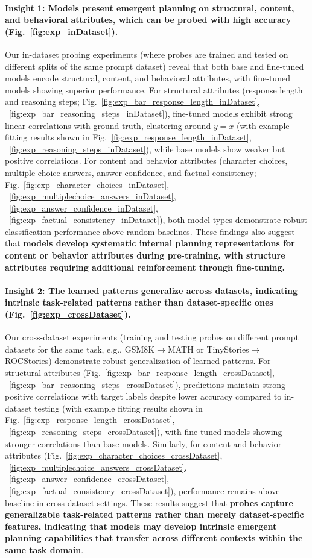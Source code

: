 \paragraph{Insight 1: Models present emergent planning on structural, content, and behavioral attributes, which can be probed with high accuracy (Fig.~\ref{fig:exp_inDataset}).}
Our in-dataset probing experiments (where probes are trained and tested on different splits of the same prompt dataset) reveal that both base and fine-tuned models encode structural, content, and behavioral attributes, with fine-tuned models showing superior performance. 
For structural attributes (response length and reasoning steps; Fig.~\ref{fig:exp_bar_response_length_inDataset}, ~\ref{fig:exp_bar_reasoning_steps_inDataset}), fine-tuned models exhibit strong linear correlations with ground truth, clustering around $y=x$ (with example fitting results shown in Fig.~\ref{fig:exp_response_length_inDataset}, ~\ref{fig:exp_reasoning_steps_inDataset}), while base models show weaker but positive correlations. 
For content and behavior attributes (character choices, multiple-choice answers, answer confidence, and factual consistency; Fig.~\ref{fig:exp_character_choices_inDataset}, ~\ref{fig:exp_multiplechoice_answers_inDataset}, ~\ref{fig:exp_answer_confidence_inDataset}, ~\ref{fig:exp_factual_consistency_inDataset}), both model types demonstrate robust classification performance above random baselines.
These findings also suggest that \textbf{models develop systematic internal planning representations for content or behavior attributes during pre-training, with structure attributes requiring additional reinforcement through fine-tuning.}

\paragraph{Insight 2: The learned patterns generalize across datasets, indicating intrinsic task-related patterns rather than dataset-specific ones (Fig.~\ref{fig:exp_crossDataset}).}
Our cross-dataset experiments (training and testing probes on different prompt datasets for the same task, e.g., GSM8K$\rightarrow$MATH or TinyStories$\rightarrow$ROCStories) demonstrate robust generalization of learned patterns. 
For structural attributes (Fig.~\ref{fig:exp_bar_response_length_crossDataset}, ~\ref{fig:exp_bar_reasoning_steps_crossDataset}), predictions maintain strong positive correlations with target labels despite lower accuracy compared to in-dataset testing (with example fitting results shown in Fig.~\ref{fig:exp_response_length_crossDataset}, ~\ref{fig:exp_reasoning_steps_crossDataset}), with fine-tuned models showing stronger correlations than base models. 
Similarly, for content and behavior attributes (Fig.~\ref{fig:exp_character_choices_crossDataset}, ~\ref{fig:exp_multiplechoice_answers_crossDataset}, ~\ref{fig:exp_answer_confidence_crossDataset}, ~\ref{fig:exp_factual_consistency_crossDataset}), performance remains above baseline in cross-dataset settings.
These results suggest that \textbf{probes capture generalizable task-related patterns rather than merely dataset-specific features, indicating that models may develop intrinsic emergent planning capabilities that transfer across different contexts within the same task domain}.


